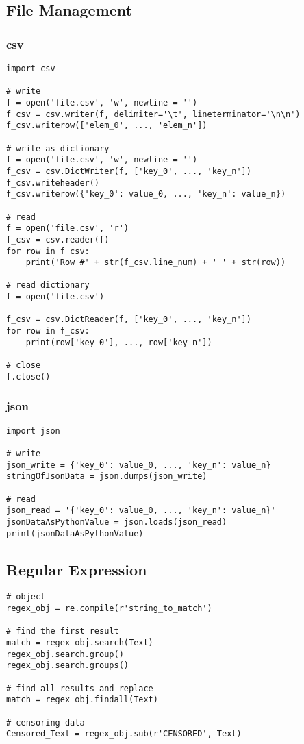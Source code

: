 \subsection{File Management}

\subsubsection{csv}

\begin{verbatim}
import csv

# write
f = open('file.csv', 'w', newline = '')
f_csv = csv.writer(f, delimiter='\t', lineterminator='\n\n')
f_csv.writerow(['elem_0', ..., 'elem_n'])

# write as dictionary
f = open('file.csv', 'w', newline = '')
f_csv = csv.DictWriter(f, ['key_0', ..., 'key_n'])
f_csv.writeheader()
f_csv.writerow({'key_0': value_0, ..., 'key_n': value_n})

# read
f = open('file.csv', 'r')
f_csv = csv.reader(f)
for row in f_csv:
    print('Row #' + str(f_csv.line_num) + ' ' + str(row))

# read dictionary
f = open('file.csv')

f_csv = csv.DictReader(f, ['key_0', ..., 'key_n'])
for row in f_csv:
    print(row['key_0'], ..., row['key_n'])

# close
f.close()
\end{verbatim}


\subsubsection{json}

\begin{verbatim}
import json

# write
json_write = {'key_0': value_0, ..., 'key_n': value_n}
stringOfJsonData = json.dumps(json_write)

# read
json_read = '{'key_0': value_0, ..., 'key_n': value_n}'
jsonDataAsPythonValue = json.loads(json_read)
print(jsonDataAsPythonValue)
\end{verbatim}



\subsection{Regular Expression}

\begin{verbatim}
# object
regex_obj = re.compile(r'string_to_match')

# find the first result
match = regex_obj.search(Text)
regex_obj.search.group()
regex_obj.search.groups()

# find all results and replace
match = regex_obj.findall(Text)

# censoring data
Censored_Text = regex_obj.sub(r'CENSORED', Text)
\end{verbatim}


